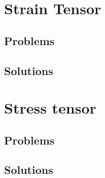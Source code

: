 %
%
%
   


   \chapter{Strain Tensor}
      
      
      
      
      
      
      \section{Problems}
         
      \section{Solutions}
         \shipoutAnswer

   \chapter{Stress tensor}
      
      
      
      
      
      
      
      
      \section{Problems}
         
      \section{Solutions}
         \shipoutAnswer


